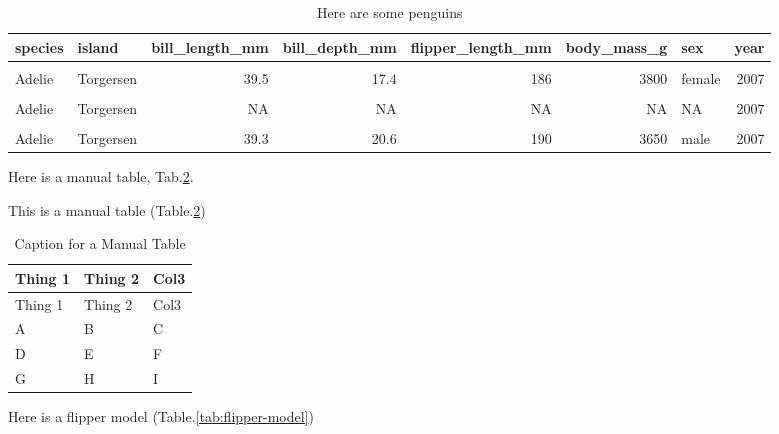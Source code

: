 \documentclass[
]{article}
\begin{document}
\begin{longtable}[t]{llrrrrlr}
\caption{\label{tab:pen-tab}Here are some penguins}\\
\toprule
species & island & bill\_length\_mm & bill\_depth\_mm & flipper\_length\_mm & body\_mass\_g & sex & year\\
\midrule
\cellcolor{gray!6}{Adelie} & \cellcolor{gray!6}{Torgersen} & \cellcolor{gray!6}{39.1} & \cellcolor{gray!6}{18.7} & \cellcolor{gray!6}{181} & \cellcolor{gray!6}{3750} & \cellcolor{gray!6}{male} & \cellcolor{gray!6}{2007}\\
Adelie & Torgersen & 39.5 & 17.4 & 186 & 3800 & female & 2007\\
\cellcolor{gray!6}{Adelie} & \cellcolor{gray!6}{Torgersen} & \cellcolor{gray!6}{40.3} & \cellcolor{gray!6}{18.0} & \cellcolor{gray!6}{195} & \cellcolor{gray!6}{3250} & \cellcolor{gray!6}{female} & \cellcolor{gray!6}{2007}\\
Adelie & Torgersen & NA & NA & NA & NA & NA & 2007\\
\cellcolor{gray!6}{Adelie} & \cellcolor{gray!6}{Torgersen} & \cellcolor{gray!6}{36.7} & \cellcolor{gray!6}{19.3} & \cellcolor{gray!6}{193} & \cellcolor{gray!6}{3450} & \cellcolor{gray!6}{female} & \cellcolor{gray!6}{2007}\\
\addlinespace
Adelie & Torgersen & 39.3 & 20.6 & 190 & 3650 & male & 2007\\
\bottomrule
\end{longtable}

Here is a manual table, Tab.\ref{tab:simple-table}.

\newpage

This is a manual table (Table.\ref{tab:simple-table})

\begin{longtable}[]{@{}lll@{}}
\caption{\label{tab:simple-table} Caption for a Manual Table}\tabularnewline
\toprule
Thing 1 & Thing 2 & Col3\tabularnewline
\midrule
\endfirsthead
\toprule
Thing 1 & Thing 2 & Col3\tabularnewline
\midrule
\endhead
A & B & C\tabularnewline
D & E & F\tabularnewline
G & H & I\tabularnewline
\bottomrule
\end{longtable}

Here is a flipper model (Table.\ref{tab:flipper-model})
\end{document}
